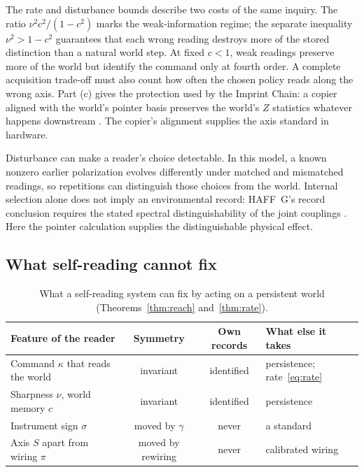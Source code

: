\documentclass[11pt,a4paper]{article}
\begin{document}
The rate and disturbance bounds describe two costs of the same inquiry. The ratio $\nu^2c^2/(1-c^2)$ marks the weak-information regime; the separate inequality $\nu^2>1-c^2$ guarantees that each wrong reading destroys more of the stored distinction than a natural world step. At fixed $c<1$, weak readings preserve more of the world but identify the command only at fourth order. A complete acquisition trade-off must also count how often the chosen policy reads along the wrong axis. Part (c) gives the protection used by the Imprint Chain: a copier aligned with the world's pointer basis preserves the world's $Z$ statistics whatever happens downstream \cite{ImprintChain}. The copier's alignment supplies the axis standard in hardware.

Disturbance can make a reader's choice detectable. In this model, a known nonzero earlier polarization evolves differently under matched and mismatched readings, so repetitions can distinguish those choices from the world. Internal selection alone does not imply an environmental record: HAFF~G's record conclusion requires the stated spectral distinguishability of the joint couplings \cite{HAFFG}. Here the pointer calculation supplies the distinguishable physical effect.

\subsection{What self-reading cannot fix}\label{subsec:standard}

\begin{table}[ht]
\centering
\small
\begin{tabular}{@{}lccl@{}}
\toprule
Feature of the reader & Symmetry & Own records & What else it takes\\
\midrule
Command $\kappa$ that reads the world & invariant & identified & persistence; rate~\eqref{eq:rate}\\
Sharpness $\nu$, world memory $c$ & invariant & identified & persistence\\
Instrument sign $\sigma$ & moved by $\gamma$ & never & a standard\\
Axis $S$ apart from wiring $\pi$ & moved by rewiring & never & calibrated wiring\\
\bottomrule
\end{tabular}
\caption{What a self-reading system can fix by acting on a persistent world (Theorems~\ref{thm:reach} and~\ref{thm:rate}).}
\label{tab:fix}
\end{table}
\end{document}
